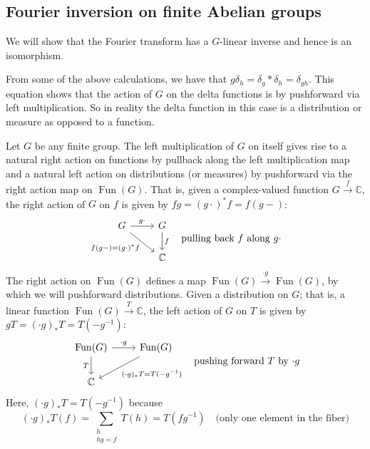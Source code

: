 \documentclass[11pt,leqno]{article}
\theoremstyle{plain}
\theoremstyle{definition}
\numberwithin{equation}{section}
\numberwithin{lem}{section}
\DeclareMathOperator{\Fun}{Fun}
\begin{document}
\subsection{Fourier inversion on finite Abelian groups}
We will show that the Fourier transform has a $G$-linear inverse and hence is an isomorphism. 

From some of the above calculations, we have that $g\delta_h = \delta_g\ast \delta_h = \delta_{gh}$. This equation shows that the action of $G$ on the delta functions is by pushforward via left multiplication. So in reality the delta function in this case is a distribution or measure as opposed to a function.

Let $G$ be any finite group. The left multiplication of $G$ on itself gives rise to a natural right action on functions by pullback along the left multiplication map and a natural left action on distributions (or measures) by pushforward via the right action map on $\Fun(G)$. That is, given a complex-valued function $G\xrightarrow{f}\mathbb C$, the right action of $G$ on $f$ is given by $fg = (g\cdot)^\ast f = f(g-)$:
\[\begin{tikzcd}[ampersand replacement=\&]
	G \& G \\
	\& {\mathbb C}
	\arrow["{g\cdot}", from=1-1, to=1-2]
	\arrow["{f(g-)=(g\cdot)^\ast f}"', from=1-1, to=2-2]
	\arrow["f", from=1-2, to=2-2]
\end{tikzcd} \quad \text{pulling back $f$ along $g\cdot$}\]
The right action on $\Fun(G)$ defines a map $\Fun(G)\xrightarrow{\cdot g}\Fun(G)$, by which we will pushforward distributions. Given a distribution on $G$; that is, a linear function $\Fun(G)\xrightarrow{T}\mathbb C$, the left action of $G$ on $T$ is given by $gT = (\cdot g)_\ast T = T(-g^{-1})$:
\[\begin{tikzcd}[ampersand replacement=\&]
	{\Fun(G)} \& {\Fun(G)} \\
	{\mathbb C}
	\arrow["{\cdot g}", from=1-1, to=1-2]
	\arrow["T"', from=1-1, to=2-1]
	\arrow["{(\cdot g)_\ast T= T(-g^{-1})}", from=1-2, to=2-1]
\end{tikzcd} \quad \text{pushing forward $T$ by $\cdot g$}\]
Here, $(\cdot g)_\ast T = T(-g^{-1})$ because
\[(\cdot g)_\ast T(f) = \sum_{\substack{h\\hg=f}}T(h) = T(fg^{-1})\quad \text{(only one element in the fiber)}\]
\end{document}

